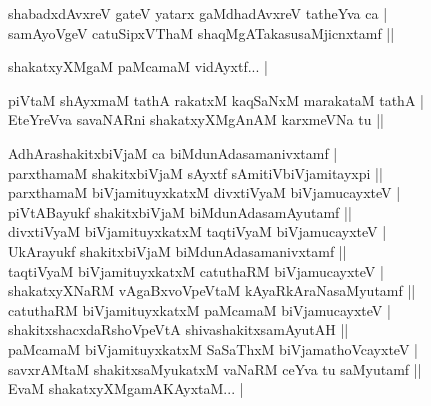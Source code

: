 \begin{entry}
\begin{shl}
shabadxdAvxreV gateV yatarx gaMdhadAvxreV tatheYva ca |\\
samAyoVgeV catuSipxVThaM shaqMgATakasusaMjicnxtamf ||
\end{shl}
\end{entry}

\begin{entry}
\begin{shl}
shakatxyXMgaM paMcamaM vidAyxtf... |
\end{shl}
\begin{shl}
piVtaM shAyxmaM tathA rakatxM kaqSaNxM marakataM tathA |\\
EteYreVva savaNARni shakatxyXMgAnAM karxmeVNa tu ||
\end{shl}
\begin{shl}
AdhArashakitxbiVjaM ca biMdunAdasamanivxtamf |\\
parxthamaM shakitxbiVjaM sAyxtf sAmitiVbiVjamitayxpi ||\\
parxthamaM biVjamituyxkatxM divxtiVyaM biVjamucayxteV |\\
piVtABayukf shakitxbiVjaM biMdunAdasamAyutamf ||\\
divxtiVyaM biVjamituyxkatxM taqtiVyaM biVjamucayxteV |\\
UkArayukf shakitxbiVjaM biMdunAdasamanivxtamf ||\\
taqtiVyaM biVjamituyxkatxM catuthaRM biVjamucayxteV |\\
shakatxyXNaRM vAgaBxvoVpeVtaM kAyaRkAraNasaMyutamf ||\\
catuthaRM biVjamituyxkatxM paMcamaM biVjamucayxteV |\\
shakitxshacxdaRshoVpeVtA shivashakitxsamAyutAH ||\\
paMcamaM biVjamituyxkatxM SaSaThxM biVjamathoVcayxteV |\\
savxrAMtaM shakitxsaMyukatxM vaNaRM ceYva tu saMyutamf ||\\
EvaM shakatxyXMgamAKAyxtaM... |
\end{shl}
\end{entry}

